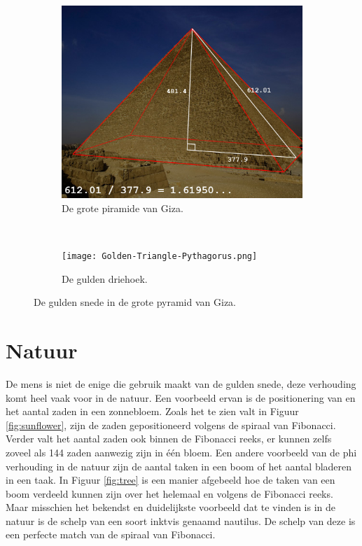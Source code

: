 \documentclass{article}
\begin{document}
\begin{figure}[Hh]
    \centering
	\begin{subfigure}[b]{0.5\textwidth}
        \includegraphics[width=\textwidth]{pyramid.jpg}
        \caption{De grote piramide van Giza.}
        \label{fig:giza}
    \end{subfigure} %
    ~
    \begin{subfigure}[b]{0.3\textwidth}
        \texttt{[image: Golden-Triangle-Pythagorus.png]}
        \caption{De gulden driehoek.}
        \label{fig:driehoek}
    \end{subfigure}
    \caption{De gulden snede in de grote pyramid van Giza.}
    \label{fig:pyramid-phi}
\end{figure}

\section{Natuur}

De mens is niet de enige die gebruik maakt van de gulden snede, deze verhouding komt heel vaak voor in de natuur. Een voorbeeld ervan is de positionering van en het aantal zaden in een zonnebloem. Zoals het te zien valt in Figuur \ref{fig:sunflower}, zijn de zaden gepositioneerd volgens de spiraal van Fibonacci. Verder valt het aantal zaden ook binnen de Fibonacci reeks, er kunnen zelfs zoveel als 144 zaden aanwezig zijn in \'e\'en bloem. Een andere voorbeeld van de phi verhouding in de natuur zijn de aantal taken in een boom of het aantal bladeren in een taak. In Figuur \ref{fig:tree} is een manier afgebeeld hoe de taken van een boom verdeeld kunnen zijn over het helemaal en volgens de Fibonacci reeks. Maar misschien het bekendst en duidelijkste voorbeeld dat te vinden is in de natuur is de schelp van een soort inktvis genaamd nautilus. De schelp van deze is een perfecte match van de spiraal van Fibonacci.
\end{document}
